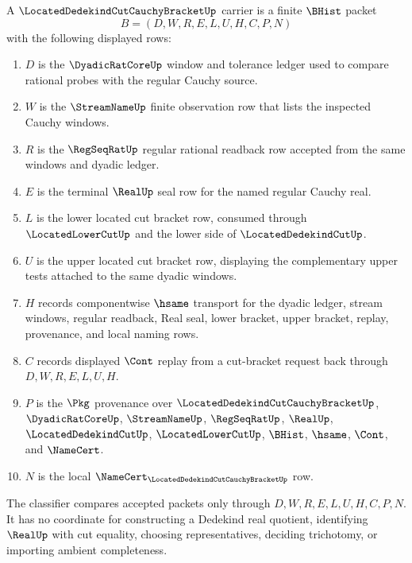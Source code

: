 \begin{definition}
\label{def:located-dedekind-cut-cauchy-bracket-carrier}
A $\LocatedDedekindCutCauchyBracketUp$ carrier is a finite $\BHist$ packet
$$
B=(D,W,R,E,L,U,H,C,P,N)
$$
with the following displayed rows:
\begin{enumerate}
\item $D$ is the $\DyadicRatCoreUp$ window and tolerance ledger used to compare rational probes with the regular Cauchy source.
\item $W$ is the $\StreamNameUp$ finite observation row that lists the inspected Cauchy windows.
\item $R$ is the $\RegSeqRatUp$ regular rational readback row accepted from the same windows and dyadic ledger.
\item $E$ is the terminal $\RealUp$ seal row for the named regular Cauchy real.
\item $L$ is the lower located cut bracket row, consumed through $\LocatedLowerCutUp$ and the lower side of $\LocatedDedekindCutUp$.
\item $U$ is the upper located cut bracket row, displaying the complementary upper tests attached to the same dyadic windows.
\item $H$ records componentwise $\hsame$ transport for the dyadic ledger, stream windows, regular readback, Real seal, lower bracket, upper bracket, replay, provenance, and local naming rows.
\item $C$ records displayed $\Cont$ replay from a cut-bracket request back through $D,W,R,E,L,U,H$.
\item $P$ is the $\Pkg$ provenance over $\LocatedDedekindCutCauchyBracketUp$, $\DyadicRatCoreUp$, $\StreamNameUp$, $\RegSeqRatUp$, $\RealUp$, $\LocatedDedekindCutUp$, $\LocatedLowerCutUp$, $\BHist$, $\hsame$, $\Cont$, and $\NameCert$.
\item $N$ is the local $\NameCert_{\LocatedDedekindCutCauchyBracketUp}$ row.
\end{enumerate}
The classifier compares accepted packets only through $D,W,R,E,L,U,H,C,P,N$. It has no coordinate for constructing a Dedekind real quotient, identifying $\RealUp$ with cut equality, choosing representatives, deciding trichotomy, or importing ambient completeness.
\end{definition}

